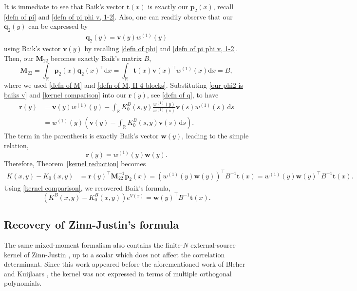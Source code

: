 \documentclass[a4paper,10pt,leqno]{amsart}
\numberwithin{equation}{section}
\theoremstyle{remark}
\newcommand{\dd}{\mathrm{d}}
\newcommand{\R}{\mathbb{R}}
\begin{document}
It is immediate to see that Baik's vector $\mathbf{t}(x)$ is exactly our $\bm{p}_2(x)$, recall \eqref{defn of pi} and \eqref{defn of pi phi v, 1-2}. Also, one can readily observe that our $\bm{q}_2(y)$ can be expressed by
\begin{align} \label{our phi2 is baiks v}
    \bm{q}_2(y) = \mathbf{v}(y) w^{(1)}(y)
\end{align}
using Baik's vector $\mathbf{v}(y)$ by recalling \eqref{defn of phi} and \eqref{defn of pi phi v, 1-2}.
Then, our $\bm{M}_{22}$ becomes exactly Baik's matrix $B$,
\[
\bm{M}_{22} = \int_\R \bm{p}_2(x) \bm{q}_2(x)^\top \dd x = \int_\R \mathbf{t}(x) \mathbf{v}(x)^\top w^{(1)}(x) \dd x = B,
\]
where we used \eqref{defn of M} and \eqref{defn of M, H 4 blocks}.
Substituting \eqref{our phi2 is baiks v} and \eqref{kernel comparison} into our $\bm{r}(y)$, see \eqref{defn of q}, to have
\begin{align*}
    \bm{r}(y) %
    &= \mathbf{v}(y)w^{(1)}(y) - \int_\R K^B_0 (s,y) \frac{w^{(1)}(y)}{w^{(1)}(s)} \mathbf{v}(s) w^{(1)}(s) \, \dd s \\
    &= w^{(1)}(y) \left( \mathbf{v}(y) - \int_\R K_{0}^B(s,y) \mathbf{v}(s) \, \dd s \right).
\end{align*}
The term in the parenthesis is exactly Baik's vector $\mathbf{w}(y)$, leading to the simple relation,
\begin{equation}
    \bm{r}(y) = w^{(1)}(y) \mathbf{w}(y).
\end{equation}
Therefore, Theorem~\ref{kernel reduction} becomes
\begin{align}
K(x,y)-K_0(x,y) &= \bm{r}(y)^\top \bm{M}_{22}^{-1} \bm{p}_2(x) = (w^{(1)}(y) \mathbf{w}(y))^\top B^{-1} \mathbf{t}(x) = w^{(1)}(y) \mathbf{w}(y)^\top B^{-1} \mathbf{t}(x).
\end{align}
Using \eqref{kernel comparison}, we recovered Baik's formula,
\begin{equation}
\left( K^B(x,y)-K^B_{0}(x,y) \right) e^{V(x)}= \mathbf{w}(y)^{\top} B^{-1}\mathbf{t}(x).
\end{equation}


 
 


\subsection{Recovery of Zinn-Justin's formula}
The same mixed-moment formalism also contains the finite-$N$ external-source
kernel of Zinn-Justin \cite{ZinnJustin1997}, up to a scalar which does not affect the correlation determinant.
Since this work appeared before the aforementioned work
of Bleher and Kuijlaars \cite{BK0}, the kernel was not expressed in terms of
multiple orthogonal polynomials. 
\end{document}
